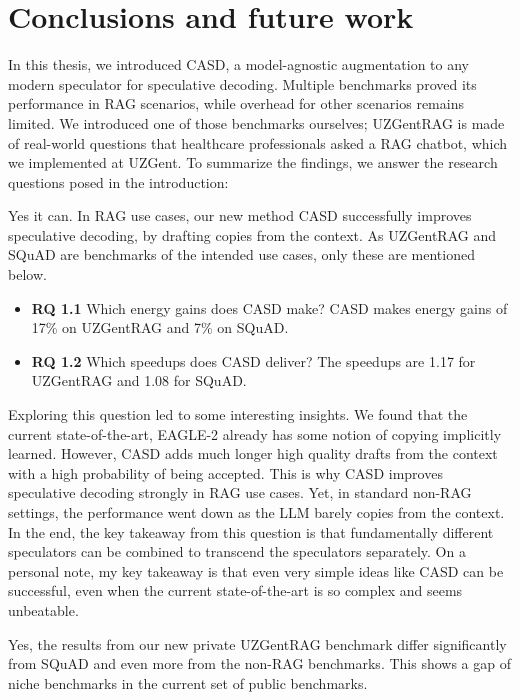 
\chapter{Conclusions and future work}
\label{sec:conclusion_future_work}

In this thesis, we introduced CASD, a model-agnostic augmentation to any modern speculator for speculative decoding. Multiple benchmarks proved its performance in RAG scenarios, while overhead for other scenarios remains limited. We introduced one of those benchmarks ourselves; UZGentRAG is made of real-world questions that healthcare professionals asked a RAG chatbot, which we implemented at UZGent. To summarize the findings, we answer the research questions posed in the introduction:

\begin{tcolorbox}[colback=blue-ish-light,colframe=blue-ish,title=\textbf{RQ1:} Could context improve speculative decoding?, coltitle=white]
    Yes it can. In RAG use cases, our new method CASD successfully improves speculative decoding, by drafting copies from the context. As UZGentRAG and SQuAD are benchmarks of the intended use cases, only these are mentioned below.
    \begin{itemize}
        \item \textbf{RQ 1.1} Which energy gains does CASD make? CASD makes energy gains of 17\% on UZGentRAG and 7\% on SQuAD.
        \item \textbf{RQ 1.2} Which speedups does CASD deliver? The speedups are 1.17 for UZGentRAG and 1.08 for SQuAD.
    \end{itemize}
\end{tcolorbox}

Exploring this question led to some interesting insights. We found that the current state-of-the-art, EAGLE-2 already has some notion of copying implicitly learned. However, CASD adds much longer high quality drafts from the context with a high probability of being accepted. This is why CASD improves speculative decoding strongly in RAG use cases. Yet, in standard non-RAG settings, the performance went down as the LLM barely copies from the context. In the end, the key takeaway from this question is that fundamentally different speculators can be combined to transcend the speculators separately. On a personal note, my key takeaway is that even very simple ideas like CASD can be successful, even when the current state-of-the-art is so complex and seems unbeatable. 

\begin{tcolorbox}[colback=blue-ish-light,colframe=blue-ish,title=\textbf{RQ2:} Does a real-world benchmark in a niche domain show significantly different results from existing speculative decoding benchmarks?, coltitle=white]
    Yes, the results from our new private UZGentRAG benchmark differ significantly from SQuAD and even more from the non-RAG benchmarks. This shows a gap of niche benchmarks in the current set of public benchmarks.
\end{tcolorbox}

